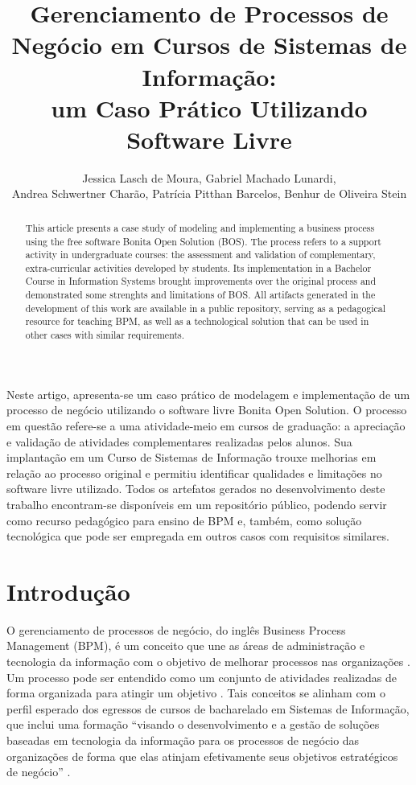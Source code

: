 \documentclass[12pt]{article}
\title{Gerenciamento de Processos de Negócio em Cursos de Sistemas de Informação:\\ um Caso Prático Utilizando Software Livre}
\author{Jessica Lasch de Moura\inst{1}, Gabriel Machado Lunardi\inst{1},\\
Andrea Schwertner Charão\inst{1}, Patrícia Pitthan Barcelos\inst{1}, Benhur de Oliveira Stein\inst{1}}
\begin{document}
\maketitle


\begin{resumo}
Neste artigo, apresenta-se um caso prático de modelagem e implementação de um processo de negócio utilizando o software livre Bonita Open Solution. O processo em questão refere-se a uma atividade-meio em cursos de graduação: a apreciação e validação de atividades complementares realizadas pelos alunos. Sua implantação em um Curso de Sistemas de Informação trouxe melhorias em relação ao processo original e permitiu identificar qualidades e limitações no software livre utilizado. Todos os artefatos gerados no desenvolvimento deste trabalho encontram-se disponíveis em um repositório público, podendo servir como recurso pedagógico para ensino de BPM e, também, como solução tecnológica que pode ser empregada em outros casos com requisitos similares.
\end{resumo}


\begin{abstract}
This article presents a case study of modeling and implementing a business process using the free software Bonita Open Solution (BOS). The process refers to a support activity in undergraduate courses: the assessment and validation of complementary, extra-curricular activities developed by students. Its implementation in a Bachelor Course in Information Systems brought improvements over the original process and demonstrated some strenghts and limitations of BOS. All artifacts generated in the development of this work are available in a public repository, serving as a pedagogical resource for teaching BPM, as well as a technological solution that can be used in other cases with similar requirements.
\end{abstract}


\section{Introdução}

O gerenciamento de processos de negócio, do inglês Business Process Management (BPM), é um conceito que une as áreas de administração e tecnologia da informação com o objetivo de melhorar processos nas organizações \cite{weske}. Um processo pode ser entendido como um conjunto de atividades realizadas de forma organizada para atingir um objetivo \cite{ABPMP}. Tais conceitos se alinham com o perfil esperado dos egressos de cursos de bacharelado em Sistemas de Informação, que inclui uma formação “visando o desenvolvimento e a gestão de soluções baseadas em tecnologia da informação para os processos de negócio das organizações de forma que elas atinjam efetivamente seus objetivos estratégicos de negócio” \cite{parecer:136}.
\end{document}
